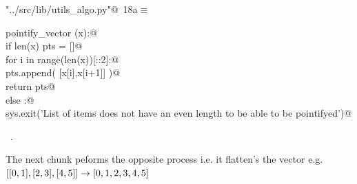 \documentclass[11.5pt]{report}
\begin{document}
\begin{flushleft} \small
\begin{minipage}{\linewidth}\label{scrap14}\raggedright\small
{} \verb@"../src/lib/utils_algo.py"@\nobreak\ {\footnotesize {18a}}$\equiv$
\vspace{-1ex}
\begin{list}{}{} \item
\mbox{}\verb@def pointify_vector (x):@\\
\mbox{}\verb@    if len(x) % 2 == 0:@\\
\mbox{}\verb@        pts = []@\\
\mbox{}\verb@        for i in range(len(x))[::2]:@\\
\mbox{}\verb@            pts.append( [x[i],x[i+1]] )@\\
\mbox{}\verb@        return pts@\\
\mbox{}\verb@    else :@\\
\mbox{}\verb@        sys.exit('List of items does not have an even length to be able to be pointifyed')@\\
\mbox{}\verb@@{\NWsep}
\end{list}
\vspace{-1.5ex}
\footnotesize
\begin{list}{}{\setlength{\itemsep}{-\parsep}\setlength{\itemindent}{-\leftmargin}}
\item \NWtxtFileDefBy\ .

\item{}
\end{list}
\end{minipage}\vspace{4ex}
\end{flushleft}

\vspace{-0.8cm}
The next chunk peforms the opposite process i.e. it flatten's the vector
e.g. $[[0,1],[2,3],[4,5]] \rightarrow [0,1,2,3,4,5]$
\end{document}
